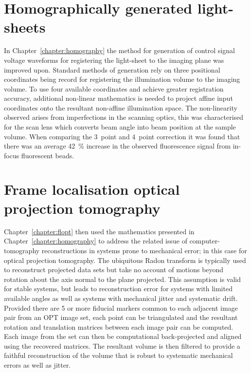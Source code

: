 \section{Homographically generated light-sheets}
In Chapter~\ref{chapter:homography} the method for generation of control signal voltage waveforms for registering the light-sheet to the imaging plane was improved upon.
Standard methods of generation rely on three positional coordinates being record for registering the illumination volume to the imaging volume.
To use four available coordinates and achieve greater registration accuracy, additional non-linear mathematics is needed to project affine input coordinates onto the resultant non-affine illumination space.
The non-linearity observed arises from imperfections in the scanning optics, this was characterised for the scan lens which converts beam angle into beam position at the sample volume.
When comparing the 3~point and 4~point correction it was found that there was an average \SI{42}{\percent} increase in the observed fluorescence signal from in-focus fluorescent beads.

\section{Frame localisation optical projection tomography}
Chapter~\ref{chapter:flopt} then used the mathematics presented in Chapter~\ref{chapter:homography} to address the related issue of computer-tomography reconstructions in systems prone to mechanical error; in this case for optical projection tomography.
The ubiquitous Radon transform is typically used to reconstruct projected data sets but take no account of motions beyond rotation about the axis normal to the plane projected.
This assumption is valid for stable systems, but leads to reconstruction error for systems with limited available angles as well as systems with mechanical jitter and systematic drift.
Provided there are 5 or more fiducial markers common to each adjacent image pair from an \gls{OPT} image set, each point can be triangulated and the resultant rotation and translation matrices between each image pair can be computed.
Each image from the set can then be computational back-projected and aligned using the recovered matrices.
The resultant volume is then filtered to provide a faithful reconstruction of the volume that is robust to systematic mechanical errors as well as jitter.

